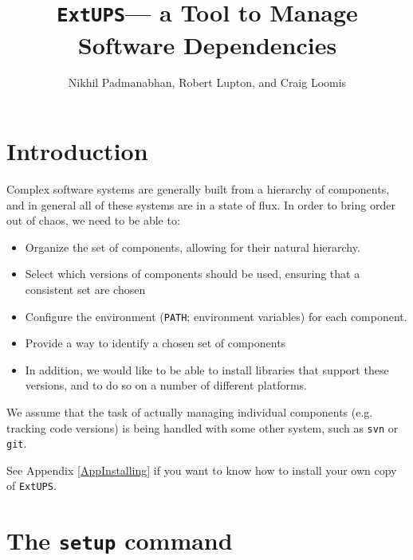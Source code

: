 \documentclass{article}
\newcommand{\code}[1]{\texttt{#1}}
\newcommand{\eups}{\code{ExtUPS}\xspace}
\begin{document}
\title{\eups --- a Tool to Manage Software Dependencies}
\author{Nikhil Padmanabhan, Robert Lupton, and Craig Loomis}

\maketitle

\tableofcontents
\newpage


\section{Introduction}

Complex software systems are generally built from a hierarchy of
components, and in general all of these systems are in a state of
flux.  In order to bring order out of chaos, we need to be able to:
\begin{itemize}
  \item Organize the set of components, allowing for their natural
    hierarchy.

  \item
    Select which versions of components should be used, ensuring
    that a consistent set are chosen

  \item
    Configure the environment (\code{PATH}; environment variables)
    for each component.

  \item
    Provide a way to identify a chosen set of components

  \item
    In addition, we would like to be able to install libraries that support
    these versions, and to do so on a number of different platforms.
\end{itemize}

We assume that the task of actually managing individual components
(e.g. tracking code versions) is being handled with some other system,
such as \code{svn} or \code{git}.

See Appendix \ref{AppInstalling} if you want to know how to install your own copy of \eups.

\section{The \code{setup} command}
\end{document}
